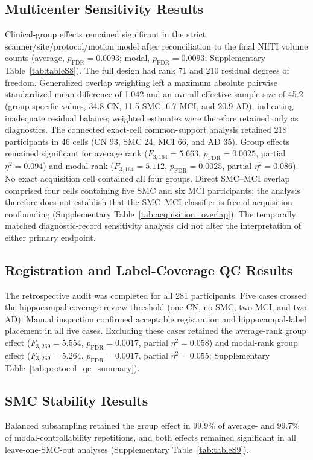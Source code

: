 \documentclass{article}
\begin{document}
\subsection{Multicenter Sensitivity Results}
Clinical-group effects remained significant in the strict scanner/site/protocol/motion model after reconciliation to the final NIfTI volume counts (average, \(p_{\mathrm{FDR}}=0.0093\); modal, \(p_{\mathrm{FDR}}=0.0093\); Supplementary Table~\ref{tab:tableS8}). The full design had rank 71 and 210 residual degrees of freedom. Generalized overlap weighting left a maximum absolute pairwise standardized mean difference of 1.042 and an overall effective sample size of 45.2 (group-specific values, 34.8 CN, 11.5 SMC, 6.7 MCI, and 20.9 AD), indicating inadequate residual balance; weighted estimates were therefore retained only as diagnostics. The connected exact-cell common-support analysis retained 218 participants in 46 cells (CN 93, SMC 24, MCI 66, and AD 35). Group effects remained significant for average rank (\(F_{3,164}=5.663\), \(p_{\mathrm{FDR}}=0.0025\), partial \(\eta^2=0.094\)) and modal rank (\(F_{3,164}=5.112\), \(p_{\mathrm{FDR}}=0.0025\), partial \(\eta^2=0.086\)). No exact acquisition cell contained all four groups. Direct SMC--MCI overlap comprised four cells containing five SMC and six MCI participants; the analysis therefore does not establish that the SMC--MCI classifier is free of acquisition confounding (Supplementary Table~\ref{tab:acquisition_overlap}). The temporally matched diagnostic-record sensitivity analysis did not alter the interpretation of either primary endpoint.

\subsection{Registration and Label-Coverage QC Results}
The retrospective audit was completed for all 281 participants. Five cases crossed the hippocampal-coverage review threshold (one CN, no SMC, two MCI, and two AD). Manual inspection confirmed acceptable registration and hippocampal-label placement in all five cases. Excluding these cases retained the average-rank group effect (\(F_{3,269}=5.554\), \(p_{\mathrm{FDR}}=0.0017\), partial \(\eta^2=0.058\)) and modal-rank group effect (\(F_{3,269}=5.264\), \(p_{\mathrm{FDR}}=0.0017\), partial \(\eta^2=0.055\); Supplementary Table~\ref{tab:protocol_qc_summary}).

\subsection{SMC Stability Results}
Balanced subsampling retained the group effect in 99.9\% of average- and 99.7\% of modal-controllability repetitions, and both effects remained significant in all leave-one-SMC-out analyses (Supplementary Table~\ref{tab:tableS9}).
\end{document}
